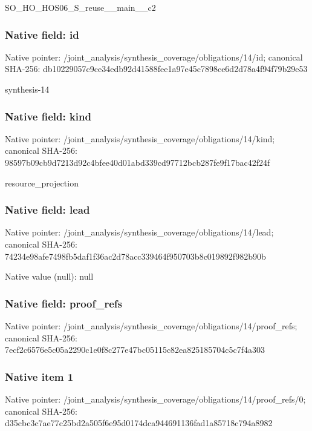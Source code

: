 \documentclass[10pt,a4paper]{article}
\begin{document}
\begingroup\raggedright\sloppy SO\_\allowbreak{}HO\_\allowbreak{}HOS06\_\allowbreak{}S\_\allowbreak{}reuse\_\allowbreak{}\_\allowbreak{}main\_\allowbreak{}\_\allowbreak{}c2\par\endgroup

\subsubsection{Native field: id}
Native pointer: /joint\_\allowbreak{}analysis/synthesis\_\allowbreak{}coverage/obligations/14/id; canonical SHA-256: db10229057c9ce34edb92d41588fee1a97e45c7898ce6d2d78a4f94f79b29e53

\begingroup\raggedright\sloppy synthesis-14\par\endgroup

\subsubsection{Native field: kind}
Native pointer: /joint\_\allowbreak{}analysis/synthesis\_\allowbreak{}coverage/obligations/14/kind; canonical SHA-256: 98597b09cb9d7213d92c4bfee40d01abd339cd97712bcb287fe9f17bac42f24f

\begingroup\raggedright\sloppy resource\_\allowbreak{}projection\par\endgroup

\subsubsection{Native field: lead}
Native pointer: /joint\_\allowbreak{}analysis/synthesis\_\allowbreak{}coverage/obligations/14/lead; canonical SHA-256: 74234e98afe7498fb5daf1f36ac2d78acc339464f950703b8c019892f982b90b

Native value (null): null

\subsubsection{Native field: proof\_\allowbreak{}refs}
Native pointer: /joint\_\allowbreak{}analysis/synthesis\_\allowbreak{}coverage/obligations/14/proof\_\allowbreak{}refs; canonical SHA-256: 7ecf2c6576e5c05a2290c1e0f8c277e47bc05115c82ea825185704c5c7f4a303

\subsubsection{Native item 1}
Native pointer: /joint\_\allowbreak{}analysis/synthesis\_\allowbreak{}coverage/obligations/14/proof\_\allowbreak{}refs/0; canonical SHA-256: d35cbc3c7ae77c25bd2a505f6e95d0174dca944691136fad1a85718c794a8982
\end{document}
